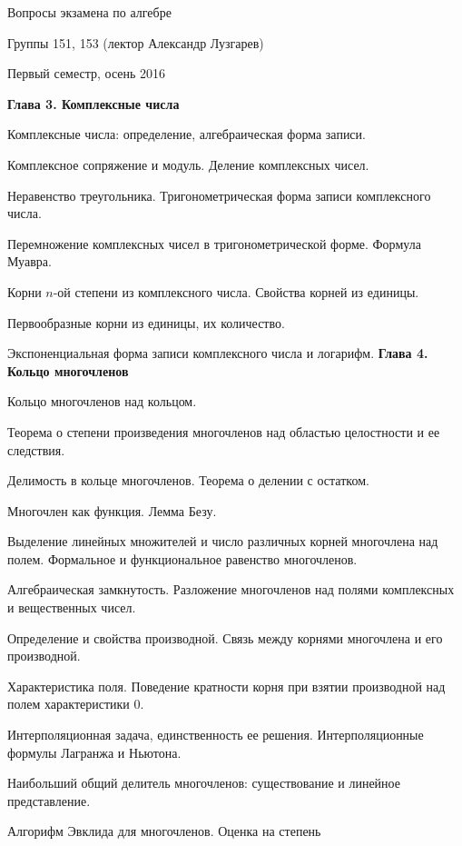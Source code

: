 \documentclass[12pt]{article}
\newcommand\glava[1]{{\medskip\bf\hfill #1}}
\begin{document}
\begin{center}
{\Large Вопросы экзамена по алгебре}
\par\medskip
Группы 151, 153 (лектор Александр Лузгарев)
\par\medskip
Первый семестр, осень 2016
\end{center}

\glava{Глава 3. Комплексные числа}
\begin{compactenum}
\item Комплексные числа: определение, алгебраическая форма записи.
\item Комплексное сопряжение и модуль. Деление комплексных чисел.
\item Неравенство треугольника. Тригонометрическая форма записи
  комплексного числа.
\item Перемножение комплексных чисел в тригонометрической
  форме. Формула Муавра.
\item Корни $n$-ой степени из комплексного числа. Свойства корней из
  единицы.
\item Первообразные корни из единицы, их количество.
\item Экспоненциальная форма записи комплексного числа и логарифм.
\glava{Глава 4. Кольцо многочленов}
\item Кольцо многочленов над кольцом.
\item Теорема о степени произведения многочленов
  над областью целостности и ее следствия.
\item Делимость в кольце многочленов. Теорема о делении с остатком.
\item Многочлен как функция. Лемма Безу.
\item Выделение линейных множителей и число различных корней
  многочлена над полем. Формальное и функциональное равенство
  многочленов.
\item Алгебраическая замкнутость. Разложение многочленов над полями
  комплексных и вещественных чисел.
\item Определение и свойства производной. Связь между корнями
  многочлена и его производной.
\item Характеристика поля. Поведение кратности корня при взятии
  производной над полем характеристики $0$.
\item Интерполяционная задача, единственность ее решения.
  Интерполяционные формулы Лагранжа и Ньютона.
\item Наибольший общий делитель многочленов: существование и линейное
  представление.
\item Алгорифм Эвклида для многочленов. Оценка на степень

\end{compactenum}
\end{document}
